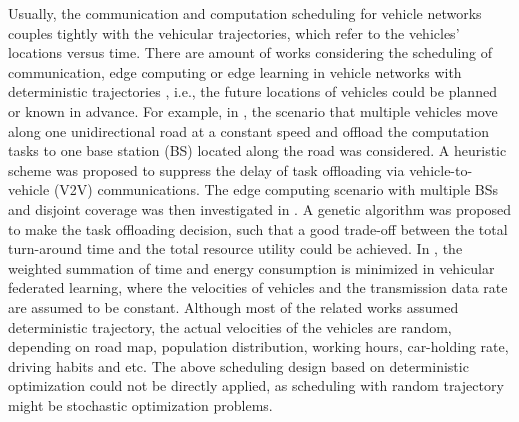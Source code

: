 Usually, the communication and computation scheduling for vehicle networks couples tightly with the vehicular trajectories, which refer to the vehicles' locations versus time.
There are amount of works considering the scheduling of communication, edge computing or edge learning in vehicle networks with deterministic trajectories
\cite{Globecom18-Wang, Access19-Xu, TITS21-Xiao, JSAC23-Pervej, IOTJ22-Lv, TVT22-Hui},
i.e., the future locations of vehicles could be planned or known in advance.
For example, in \cite{Globecom18-Wang}, the scenario that multiple vehicles move along one unidirectional road at a constant speed and offload the computation tasks to one base station (BS) located along the road was considered. A heuristic scheme was proposed to suppress the delay of task offloading via vehicle-to-vehicle (V2V) communications.
The edge computing scenario with multiple BSs and disjoint coverage was then investigated in \cite{Access19-Xu}. A genetic algorithm was proposed to make the task offloading decision, such that a good trade-off between the total turn-around time and the total resource utility could be achieved.
In \cite{TITS21-Xiao}, the weighted summation of time and energy consumption is minimized in vehicular federated learning, where the velocities of vehicles and the transmission data rate are assumed to be constant. 
Although most of the related works assumed deterministic trajectory, the actual velocities of the vehicles are random, depending on road map, population distribution, working hours, car-holding rate, driving habits and etc. The above scheduling design based on deterministic optimization could not be directly applied, as scheduling with random trajectory might be stochastic optimization problems.

